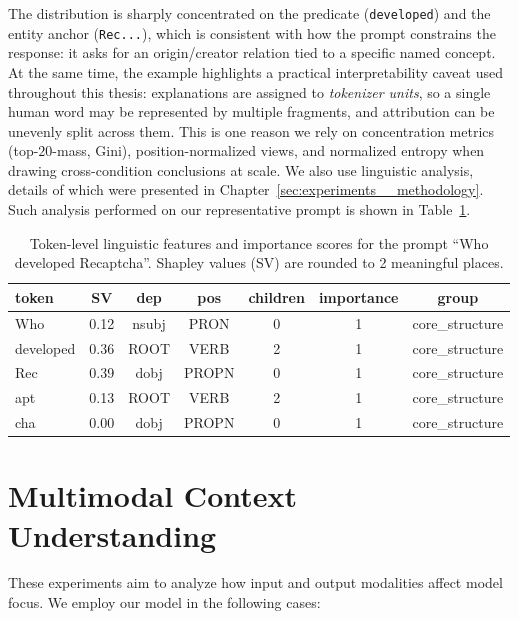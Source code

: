 \newpage
The distribution is sharply concentrated on the predicate (\texttt{developed}) and the entity anchor (\texttt{Rec...}), which is consistent with how the prompt constrains the response: it asks for an origin/creator relation tied to a specific named concept. At the same time, the example highlights a practical interpretability caveat used throughout this thesis: explanations are assigned to \emph{tokenizer units}, so a single human word may be represented by multiple fragments, and attribution can be unevenly split across them. This is one reason we rely on concentration metrics (top-$20$-mass, Gini), position-normalized views, and normalized entropy when drawing cross-condition conclusions at scale. We also use linguistic analysis, details of which were presented in Chapter~\ref{sec:experiments__methodology}. Such analysis performed on our representative prompt is shown in Table~\ref{tab:experiments__multi_modal_context__results__token_analysis}.

\begin{table}[h!]
\centering
\caption{Token-level linguistic features and importance scores for the prompt ``Who developed Recaptcha''. Shapley values (SV) are rounded to 2 meaningful places.}
\begin{tabular}{lcccccc}
\hline
\textbf{token} & \textbf{SV} & \textbf{dep} & \textbf{pos} & \textbf{children} & \textbf{importance} & \textbf{group} \\ \hline
Who & 0.12 & nsubj & PRON & 0 & 1 & core\_structure \\
developed & 0.36 & ROOT & VERB & 2 & 1 & core\_structure \\
Rec & 0.39 & dobj & PROPN & 0 & 1 & core\_structure \\
apt & 0.13 & ROOT & VERB & 2 & 1 & core\_structure \\
cha & 0.00 & dobj & PROPN & 0 & 1 & core\_structure \\ \hline
\end{tabular}
\label{tab:experiments__multi_modal_context__results__token_analysis}
\end{table}

\section{Multimodal Context Understanding}
\label{subsec:experiments__multi_modal_context}

These experiments aim to analyze how input and output modalities affect model focus. We employ our model in the following cases:


